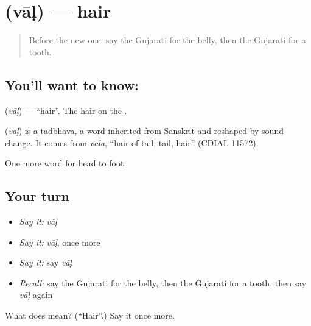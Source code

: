 \section[\texorpdfstring{\gu{વાળ} (vāḷ)}{વાળ (vāḷ)}]{ (vāḷ) — hair}

\label{lesson:GU-C46-hair}



\begin{quote}
Before the new one: say the Gujarati for the belly, then the Gujarati for a tooth.
\end{quote}

\subsection*{You'll want to know: }
\textbf{} (\emph{vāḷ}) — \textquotedblleft{}hair\textquotedblright{}. The hair on the \textbf{}.

\begin{cousinweb}
\textbf{} (\emph{vāḷ}) is a tadbhava, a word inherited from Sanskrit and reshaped by sound change. It comes from \emph{vāla}, \textquotedblleft{}hair of tail, tail, hair\textquotedblright{} (CDIAL 11572).
\end{cousinweb}

\begin{grammarlens}[title={What you've built}]
One more word for head to foot.
\end{grammarlens}

\subsection*{Your turn}
\begin{itemize}
\raggedright
  \item \emph{Say it:} \emph{vāḷ}
  \item \emph{Say it:} \emph{vāḷ}, once more
  \item \emph{Say it:} say \emph{vāḷ}
  \item \emph{Recall:} say the Gujarati for the belly, then the Gujarati for a tooth, then say \emph{vāḷ} again
\end{itemize}

\begin{tcolorbox}[breakable,colback=teal!4,colframe=teal!35!black,title={Before you move on}]
What does  mean? (\textquotedblleft{}Hair\textquotedblright{}.) Say it once more.
\end{tcolorbox}
